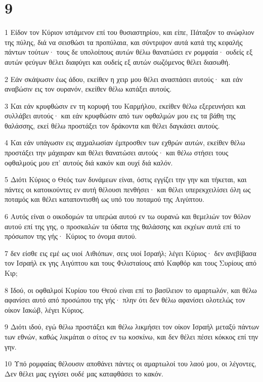 \chapter{9}

\par 1 Είδον τον Κύριον ιστάμενον επί του θυσιαστηρίου, και είπε, Πάταξον το ανώφλιον της πύλης, διά να σεισθώσι τα προπύλαια, και σύντριψον αυτά κατά της κεφαλής πάντων τούτων· τους δε υπολοίπους αυτών θέλω θανατώσει εν ρομφαία· ουδείς εξ αυτών φεύγων θέλει διαφύγει και ουδείς εξ αυτών σωζόμενος θέλει διασωθή.
\par 2 Εάν σκάψωσιν έως άδου, εκείθεν η χειρ μου θέλει ανασπάσει αυτούς· και εάν αναβώσιν εις τον ουρανόν, εκείθεν θέλω κατάξει αυτούς.
\par 3 Και εάν κρυφθώσιν εν τη κορυφή του Καρμήλου, εκείθεν θέλω εξερευνήσει και συλλάβει αυτούς· και εάν κρυφθώσιν από των οφθαλμών μου εις τα βάθη της θαλάσσης, εκεί θέλω προστάξει τον δράκοντα και θέλει δαγκάσει αυτούς.
\par 4 Και εάν υπάγωσιν εις αιχμαλωσίαν έμπροσθεν των εχθρών αυτών, εκείθεν θέλω προστάξει την μάχαιραν και θέλει θανατώσει αυτούς· και θέλω στήσει τους οφθαλμούς μου επ' αυτούς διά κακόν και ουχί διά καλόν.
\par 5 Διότι Κύριος ο Θεός των δυνάμεων είναι, όστις εγγίζει την γην και τήκεται, και πάντες οι κατοικούντες εν αυτή θέλουσι πενθήσει· και θέλει υπερεκχειλίσει όλη ως ποταμός και θέλει καταποντισθή ως υπό του ποταμού της Αιγύπτου.
\par 6 Αυτός είναι ο οικοδομών τα υπερώα αυτού εν τω ουρανώ και θεμελιών τον θόλον αυτού επί της γης, ο προσκαλών τα ύδατα της θαλάσσης και εκχέων αυτά επί το πρόσωπον της γής· Κύριος το όνομα αυτού.
\par 7 δεν είσθε εις εμέ ως υιοί Αιθιόπων, σεις υιοί Ισραήλ; λέγει Κύριος· δεν ανεβίβασα τον Ισραήλ εκ γης Αιγύπτου και τους Φιλισταίους από Καφθόρ και τους Συρίους από Κιρ;
\par 8 Ιδού, οι οφθαλμοί Κυρίου του Θεού είναι επί το βασίλειον το αμαρτωλόν, και θέλω αφανίσει αυτό από προσώπου της γής· πλην ότι δεν θέλω αφανίσει ολοτελώς τον οίκον Ιακώβ, λέγει Κύριος.
\par 9 Διότι ιδού, εγώ θέλω προστάξει και θέλω λικμήσει τον οίκον Ισραήλ μεταξύ πάντων των εθνών, καθώς λικμάται ο σίτος εν τω κοσκίνω, και δεν θέλει πέσει κόκκος επί την γην.
\par 10 Υπό ρομφαίας θέλουσιν αποθάνει πάντες οι αμαρτωλοί του λαού μου, οι λέγοντες, Δεν θέλει μας εγγίσει ουδέ μας καταφθάσει το κακόν.
